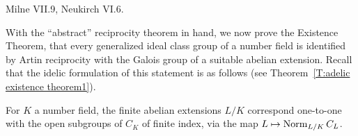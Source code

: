 %
%
%
%
%
%
%

Milne VII.9, Neukirch VI.6.

\medskip
With the ``abstract'' reciprocity theorem in hand,
we now prove the Existence Theorem, that every generalized
ideal class group of a number field
is identified by Artin reciprocity with the Galois group of a 
suitable abelian extension. Recall that the idelic formulation of this statement is as follows
(see Theorem~\ref{T:adelic existence theorem1}).
\begin{theorem} \label{T:adelic existence theorem2}
For $K$ a number field, the finite abelian extensions $L/K$ correspond
one-to-one with the open subgroups of $C_K$ of finite index, via the
map $L \mapsto \operatorname{Norm}_{L/K} C_L$.
\end{theorem}

